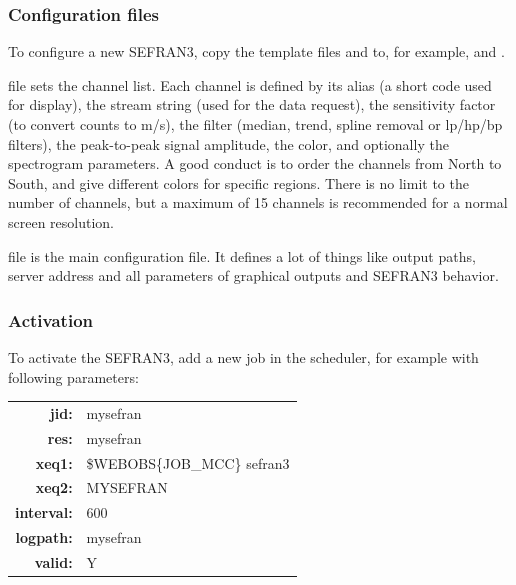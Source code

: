 \subsubsection{Configuration files}

To configure a new SEFRAN3, copy the template files  and  to, for example,  and .


 file sets the channel list. Each channel is defined by its alias (a short code used for display), the stream string (used for the data request), the sensitivity factor (to convert counts to m/s), the filter (median, trend, spline removal or lp/hp/bp filters), the peak-to-peak signal amplitude, the color, and optionally the spectrogram parameters. A good conduct is to order the channels from North to South, and give different colors for specific regions. There is no limit to the number of channels, but a maximum of 15 channels is recommended for a normal screen resolution.

 file is the main configuration file. It defines a lot of things like output paths, server address and all parameters of graphical outputs and SEFRAN3 behavior.


\label{sefran3:channels}


\label{sefran3:conf}

\subsubsection{Activation}

To activate the SEFRAN3, add a new job in the scheduler, for example with following parameters:

\begin{tabular}{rl}
\textbf{jid:}      & mysefran \\
\textbf{res:}      & mysefran \\
\textbf{xeq1:}     & \$WEBOBS\{JOB\_MCC\} sefran3 \\
\textbf{xeq2:}     & MYSEFRAN \\
\textbf{interval:} & 600 \\
\textbf{logpath:}  & mysefran \\
\textbf{valid:}    & Y \\
\end{tabular}

